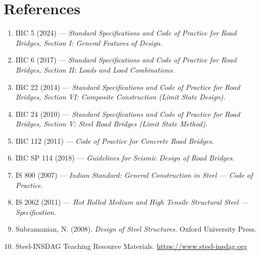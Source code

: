 \documentclass[12pt,a4paper]{report}
\numberwithin{table}{chapter}
\numberwithin{figure}{chapter}
\renewcommand{\arraystretch}{1.12}
\newcommand{\ReportSectionStyle}{\small\setlength{\tabcolsep}{3pt}\renewcommand{\arraystretch}{1.15}}
\begin{document}
\ReportSectionStyle

\chapter*{References}


\begin{enumerate}

\item IRC 5 (2024) --- \textit{Standard Specifications and Code of Practice for Road Bridges, Section I: General Features of Design.}

\item IRC 6 (2017) --- \textit{Standard Specifications and Code of Practice for Road Bridges, Section II: Loads and Load Combinations.}

\item IRC 22 (2014) --- \textit{Standard Specifications and Code of Practice for Road Bridges, Section VI: Composite Construction (Limit State Design).}

\item IRC 24 (2010) --- \textit{Standard Specifications and Code of Practice for Road Bridges, Section V: Steel Road Bridges (Limit State Method).}

\item IRC 112 (2011) --- \textit{Code of Practice for Concrete Road Bridges.}

\item IRC SP 114 (2018) --- \textit{Guidelines for Seismic Design of Road Bridges.}

\item IS 800 (2007) --- \textit{Indian Standard: General Construction in Steel --- Code of Practice.}

\item IS 2062 (2011) --- \textit{Hot Rolled Medium and High Tensile Structural Steel --- Specification.}

\item Subramanian, N. (2008). \textit{Design of Steel Structures.} Oxford University Press.

\item Steel-INSDAG Teaching Resource Materials. \url{https://www.steel-insdag.org}

\end{enumerate}
\end{document}
